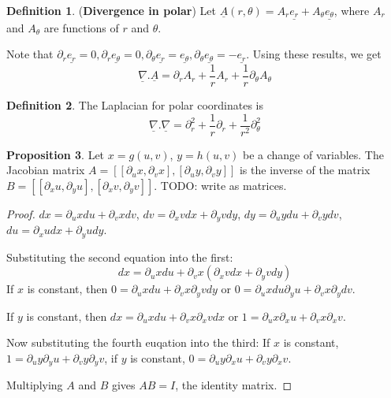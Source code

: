 \documentclass[12pt,a4paper]{article}
\theoremstyle{definition}
\newtheorem{definition}{Definition}[subsection]
\newtheorem{proposition}[definition]{Proposition}
\begin{document}
\begin{definition}
	(\textbf{Divergence in polar}) Let $\underline{A}(r, \theta) = A_r \underline{e_r} + A_{\theta} \underline{e_{\theta}}$, where $A_r$ and $A_{\theta}$ are functions of $r$ and $\theta$.

	Note that $\partial_r \underline{e_r} = 0, \partial_r \underline{e_{\theta}} = 0, \partial_{\theta} \underline{e_r} = \underline{e_{\theta}}, \partial_{\theta} \underline{e_{\theta}} = -\underline{e_r}$. Using these results, we get
	\[
		\underline{\nabla} . \underline{A} = \partial_r A_r + \frac{1}{r} A_r + \frac{1}{r} \partial_{\theta} A_{\theta}
	\]
\end{definition}

\begin{definition}
	The Laplacian for polar coordinates is
	\[
		\underline{\nabla} . \underline{\nabla} = \partial_r^2 + \frac{1}{r} \partial_r + \frac{1}{r^2} \partial_{\theta}^2
	\]
\end{definition}

\begin{proposition}
	Let $x = g(u, v)$, $y = h(u, v)$ be a change of variables. The Jacobian matrix $A = [[\partial_u x, \partial_v x], [\partial_u y, \partial_v y]]$ is the inverse of the matrix $B = [[\partial_x u, \partial_y u], [\partial_x v, \partial_y v]]$. TODO: write as matrices.
\end{proposition}

\begin{proof}
	$dx = \partial_u x du + \partial_v x dv$, $dv = \partial_x v dx + \partial_y v dy$, $dy = \partial_u y du + \partial_v y dv$, $du = \partial_x u dx + \partial_y u dy$.

	Substituting the second equation into the first:
	\[
		dx = \partial_u x du + \partial_v x (\partial_x v dx + \partial_y v dy)
	\]
	If $x$ is constant, then $0 = \partial_u x du + \partial_v x \partial_y v dy$ or $0 = \partial_u x du \partial_y u + \partial_v x \partial_y dv$.

	If $y$ is constant, then $dx = \partial_u x du + \partial_v x \partial_x v dx$ or $1 = \partial_u x \partial_x u + \partial_v x \partial_x v$.

	Now substituting the fourth euqation into the third:
	If $x$ is constant, $1 = \partial_u y \partial_y u + \partial_v y \partial_y v$, if $y$ is constant, $0 = \partial_u y \partial_x u + \partial_v y \partial_x v$.

	Multiplying $A$ and $B$ gives $AB = I$, the identity matrix.
\end{proof}
\end{document}
